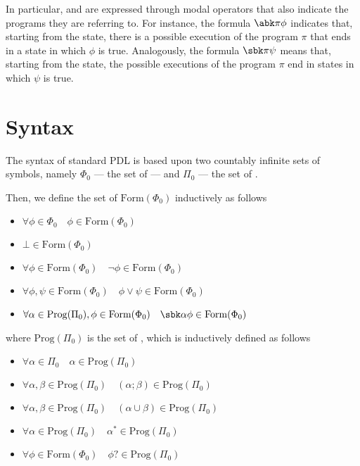 \documentclass[a4paper, 12pt]{report}
\begin{document}
    In particular,  and  are expressed through modal operators that also indicate the programs they are referring to. For instance, the formula $\abk \pi \phi$ indicates that, starting from the  state, there is a possible execution of the program $\pi$ that ends in a state in which $\phi$ is true. Analogously, the formula $\sbk \pi \psi$ means that, starting from the  state,  the possible executions of the program $\pi$ end in states in which $\psi$ is true.

    \section{Syntax}

    The syntax of standard PDL is based upon two countably infinite sets of symbols, namely $\Phi_0$ --- the set of  --- and $\Pi_0$ --- the set of .

    Then, we define the set of  $\mathrm{Form}(\Phi_0)$ inductively as follows

    \begin{itemize}
        \item $\forall \phi \in \Phi_0 \quad \phi \in \mathrm{Form}(\Phi_0)$
        \item $\bot \in \mathrm{Form}(\Phi_0)$
        \item $\forall \phi \in \mathrm{Form}(\Phi_0) \quad \lnot \phi \in \mathrm{Form}(\Phi_0)$
        \item $\forall \phi, \psi \in \mathrm{Form}(\Phi_0) \quad \phi \lor \psi \in \mathrm{Form}(\Phi_0)$
        \item $\forall \alpha \in \mathrm{Prog}(\Pi_0), \phi \in \mathrm{Form}(\Phi_0) \quad \sbk \alpha \phi \in \mathrm{Form}(\Phi_0)$
    \end{itemize}

    where $\mathrm{Prog}(\Pi_0)$ is the set of , which is inductively defined as follows
    
    \begin{itemize}
        \item $\forall \alpha \in \Pi_0 \quad \alpha \in \mathrm{Prog}(\Pi_0)$
        \item $\forall \alpha, \beta \in \mathrm{Prog}(\Pi_0) \quad (\alpha ; \beta) \in \mathrm{Prog}(\Pi_0)$
        \item $\forall \alpha, \beta \in \mathrm{Prog}(\Pi_0) \quad (\alpha \cup \beta) \in \mathrm{Prog}(\Pi_0)$
        \item $\forall \alpha \in \mathrm{Prog}(\Pi_0) \quad \alpha^* \in \mathrm{Prog}(\Pi_0)$
        \item $\forall \phi \in \mathrm{Form}(\Phi_0) \quad \phi? \in \mathrm{Prog}(\Pi_0)$
    \end{itemize}
\end{document}

